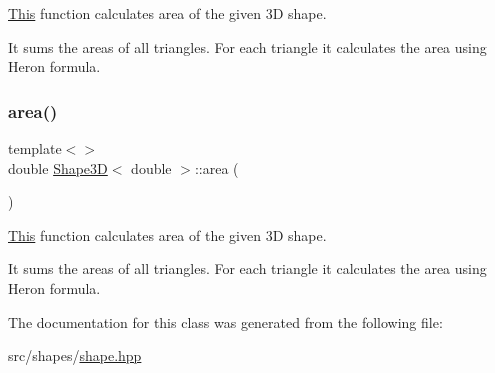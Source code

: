 \mbox{\hyperlink{classThis}{This}} function calculates area of the given 3D shape. 

It sums the areas of all triangles. For each triangle it calculates the area using Heron formula. \mbox{\label{classShape3D_a56f028736c84c6eb86f1d56e5a38c40d}} 
\subsubsection{\texorpdfstring{area()}{area()}\hspace{0.1cm}{\footnotesize\ttfamily [3/3]}}
{\footnotesize\ttfamily template$<$$>$ \\
double \mbox{\hyperlink{classShape3D}{Shape3D}}$<$ double $>$\+::area (\begin{DoxyParamCaption}{ }\end{DoxyParamCaption})\hspace{0.3cm}{\ttfamily [inline]}}



\mbox{\hyperlink{classThis}{This}} function calculates area of the given 3D shape. 

It sums the areas of all triangles. For each triangle it calculates the area using Heron formula. 

The documentation for this class was generated from the following file\+:\begin{DoxyCompactItemize}
\item 
src/shapes/\mbox{\hyperlink{shape_8hpp}{shape.\+hpp}}\end{DoxyCompactItemize}
